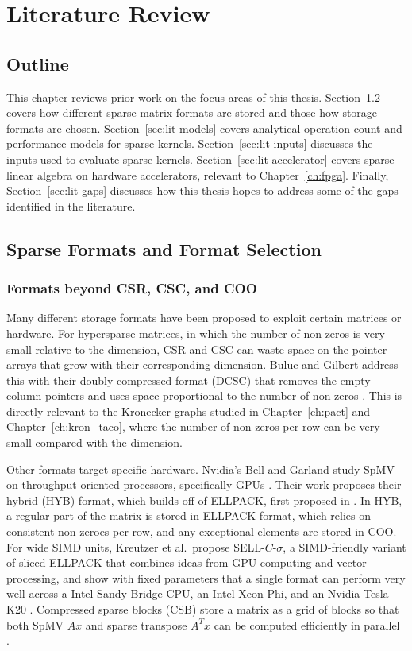 \chapter{Literature Review}
\label{ch:lit}

\section{Outline}
This chapter reviews prior work on the focus areas of this thesis. Section~\ref{sec:lit-formats} covers how different sparse matrix formats are stored and
those how storage formats are chosen. Section~\ref{sec:lit-models} covers analytical operation-count and performance models for sparse kernels. Section~\ref{sec:lit-inputs} discusses the inputs used to evaluate sparse kernels. Section~\ref{sec:lit-accelerator} covers
sparse linear algebra on hardware accelerators, relevant to Chapter~\ref{ch:fpga}. Finally, Section~\ref{sec:lit-gaps} discusses how this thesis hopes
to address some of the gaps identified in the literature.

\section{Sparse Formats and Format Selection}
\label{sec:lit-formats}

\subsection{Formats beyond CSR, CSC, and COO}
Many different storage formats have been proposed to exploit certain matrices or hardware.
For hypersparse matrices, in which the number of non-zeros is very small relative to the dimension, CSR and CSC can waste space on the pointer arrays
that grow with their corresponding dimension. Buluc and Gilbert address this with their doubly compressed format (DCSC) that removes the empty-column
pointers and uses space proportional to the number of non-zeros \cite{bulucgilbert2008hypersparse}.
This is directly relevant to the Kronecker graphs studied in Chapter~\ref{ch:pact} and Chapter~\ref{ch:kron_taco}, where the number of non-zeros per row can be very small compared with
the dimension.

Other formats target specific hardware. Nvidia's Bell and Garland study SpMV on throughput-oriented processors, specifically GPUs \cite{bell2009implementing}.
Their work proposes their hybrid (HYB) format, which builds off of ELLPACK, first proposed in \cite{ellpack}.
In HYB, a regular part of the matrix is stored in ELLPACK format, which relies on consistent non-zeroes per row,
and any exceptional elements are stored in COO. For wide SIMD units, Kreutzer et al.\ propose SELL-$C$-$\sigma$, a SIMD-friendly
variant of sliced ELLPACK that combines ideas from GPU computing and vector processing, and show with fixed parameters that a single format can perform
very well across a Intel Sandy Bridge CPU, an Intel Xeon Phi, and an Nvidia Tesla K20 \cite{unified-format}.
Compressed sparse blocks (CSB) store a matrix as a grid of blocks so that both SpMV $Ax$ and sparse transpose $A^{T}x$ can
be computed efficiently in parallel \cite{bulucfineman2009csb}.

